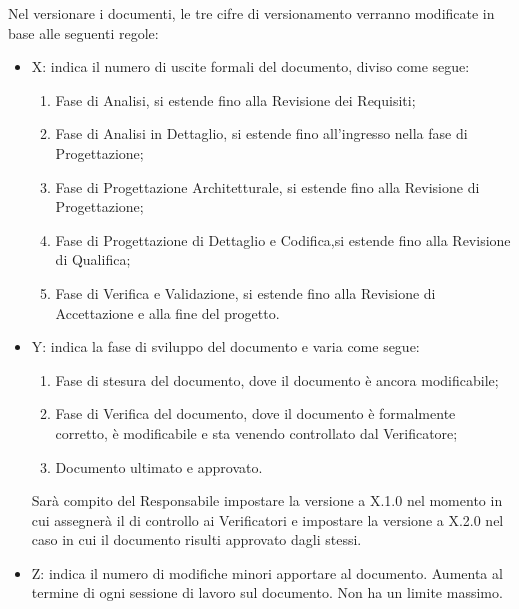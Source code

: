 Nel versionare i documenti, le tre cifre di versionamento verranno modificate in base alle seguenti regole:
\begin{itemize}
\item X: indica il numero di uscite formali del documento, diviso come segue:
\begin{enumerate}
\item Fase di Analisi, si estende fino alla Revisione dei Requisiti;
\item Fase di Analisi in Dettaglio, si estende fino all'ingresso nella fase di Progettazione;
\item Fase di Progettazione Architetturale, si estende fino alla Revisione di Progettazione;
\item Fase di Progettazione di Dettaglio e Codifica,si estende fino alla Revisione di Qualifica;
\item Fase di Verifica e Validazione, si estende fino alla Revisione di Accettazione e alla fine del progetto.
\end{enumerate}
\item Y: indica la fase di sviluppo del documento e varia come segue:
\begin{enumerate}[start=0]
\item Fase di stesura del documento, dove il documento è ancora modificabile;
\item Fase di Verifica del documento, dove il documento è formalmente corretto, è modificabile e sta venendo controllato dal Verificatore;
\item Documento ultimato e approvato.
\end{enumerate}
Sarà compito del Responsabile impostare la versione a X.1.0 nel momento in cui assegnerà il  di controllo ai Verificatori e impostare la versione a X.2.0 nel caso in cui il documento risulti approvato dagli stessi.
\item Z: indica il numero di modifiche minori apportare al documento. Aumenta al termine di ogni sessione di lavoro sul documento. Non ha un limite massimo.
\end{itemize}


